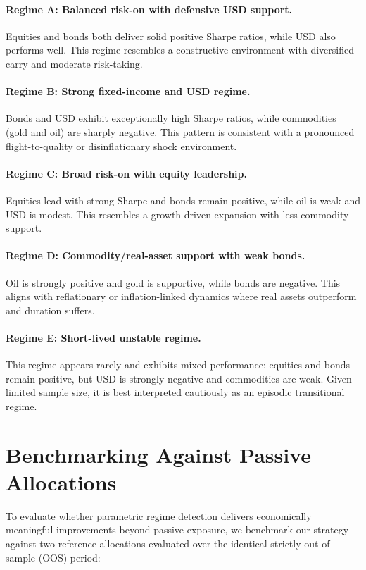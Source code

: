 \documentclass[11pt]{article}
\begin{document}
\paragraph{Regime A: Balanced risk-on with defensive USD support.}
Equities and bonds both deliver solid positive Sharpe ratios, while USD also performs well.
This regime resembles a constructive environment with diversified carry and moderate risk-taking.

\paragraph{Regime B: Strong fixed-income and USD regime.}
Bonds and USD exhibit exceptionally high Sharpe ratios, while commodities (gold and oil) are sharply negative.
This pattern is consistent with a pronounced flight-to-quality or disinflationary shock environment.

\paragraph{Regime C: Broad risk-on with equity leadership.}
Equities lead with strong Sharpe and bonds remain positive, while oil is weak and USD is modest.
This resembles a growth-driven expansion with less commodity support.

\paragraph{Regime D: Commodity/real-asset support with weak bonds.}
Oil is strongly positive and gold is supportive, while bonds are negative.
This aligns with reflationary or inflation-linked dynamics where real assets outperform and duration suffers.

\paragraph{Regime E: Short-lived unstable regime.}
This regime appears rarely and exhibits mixed performance: equities and bonds remain positive, but USD is strongly negative and commodities are weak.
Given limited sample size, it is best interpreted cautiously as an episodic transitional regime.
\section{Benchmarking Against Passive Allocations}
\label{sec:benchmarking}

To evaluate whether parametric regime detection delivers economically meaningful improvements beyond passive exposure, we benchmark our strategy against two reference allocations evaluated over the identical strictly out-of-sample (OOS) period:
\end{document}
